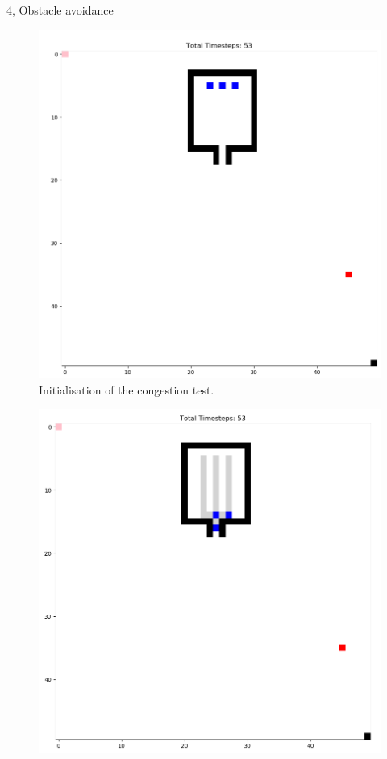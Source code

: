 \documentclass[10pt,a4paper]{article}
\begin{document}
\begin{task}{4, Obstacle avoidance}
\begin{figure}[h!]
    \centering
    \includegraphics[width=\textwidth]{pictures/start_task4_cong.PNG}
    \caption{Initialisation of the congestion test.}
    \label{fig:cong_start}
\end{figure}
\begin{figure}[h!]
    \centering
    \includegraphics[width=\textwidth]{pictures/mid_task4_cong.PNG}

\end{figure}
\end{task}
\end{document}
